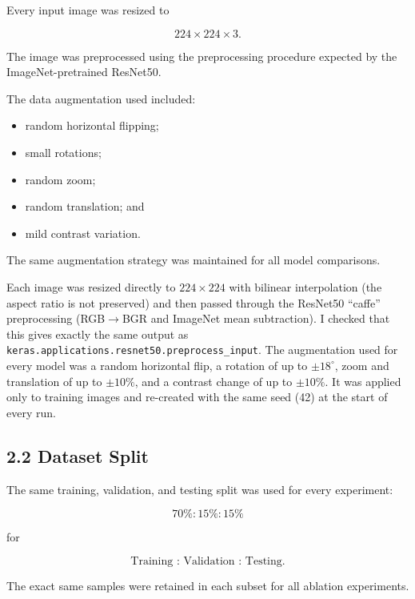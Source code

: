 \documentclass[10pt]{article}
\begin{document}
Every input image was resized to

\[
224\times224\times3.
\]

The image was preprocessed using the preprocessing procedure expected
by the ImageNet-pretrained ResNet50.

The data augmentation used included:

\begin{itemize}

\item random horizontal flipping;

\item small rotations;

\item random zoom;

\item random translation; and

\item mild contrast variation.

\end{itemize}

The same augmentation strategy was maintained for all model comparisons.

Each image was resized directly to $224\times224$ with bilinear
interpolation (the aspect ratio is not preserved) and then passed through the
ResNet50 ``caffe'' preprocessing (RGB$\rightarrow$BGR and ImageNet mean
subtraction). I checked that this gives exactly the same output as
\texttt{keras.applications.resnet50.preprocess\_input}. The augmentation used
for every model was a random horizontal flip, a rotation of up to
$\pm18^\circ$, zoom and translation of up to $\pm10\%$, and a contrast change of
up to $\pm10\%$. It was applied only to training images and re-created with the
same seed (42) at the start of every run.

\subsection*{2.2 Dataset Split}

The same training, validation, and testing split was used for every experiment:

\[
\boxed{
70\% : 15\% : 15\%
}
\]

for

\[
\text{Training : Validation : Testing}.
\]

The exact same samples were retained in each subset for all ablation
experiments.
\end{document}
